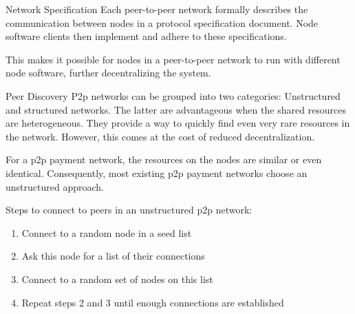 \documentclass[handout]{beamer}
\begin{document}
\begin{frame}{Network Specification}
	Each peer-to-peer network formally describes the communication between nodes in a \color{focus}protocol specification document\color{black}. Node software clients then implement and adhere to these specifications.

	\vspace{1em}

	This makes it possible for nodes in a peer-to-peer network to run with different node software, \color{focus}further decentralizing \color{black}the system.
\end{frame}

\begin{frame}{Peer Discovery}
	P2p networks can be grouped into two categories: \color{focus}Unstructured and structured networks\color{black}. The latter are advantageous when the shared resources are heterogeneous. They provide a way to quickly find even very rare resources in the network. However, this comes at the cost of reduced decentralization.
	
	\vspace{1em}
	
	For a p2p payment network, the resources on the nodes are similar or even identical. Consequently, \color{focus}most existing p2p payment networks choose an unstructured approach\color{black}.
	
	\vspace{1em}
	
	Steps to connect to peers in an unstructured p2p network:
	\begin{enumerate}
		\item Connect to a random node in a seed list
		\item Ask this node for a list of their connections
		\item Connect to a random set of nodes on this list
		\item Repeat steps 2 and 3 until enough connections are established
	\end{enumerate}
\end{frame}
\end{document}
